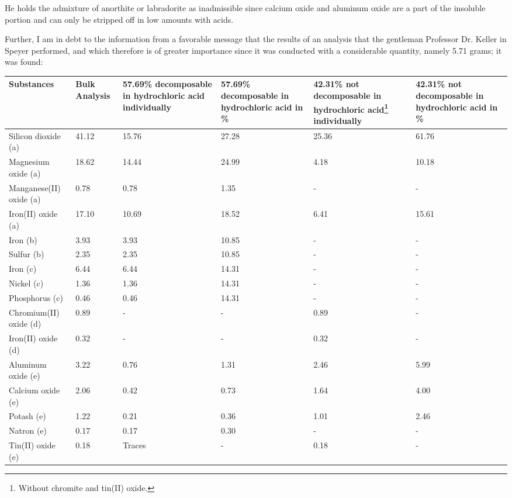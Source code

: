 \documentclass[a4paper, 12pt, oneside]{article}
\begin{document}
He holds the admixture of anorthite or labradorite as inadmissible since calcium oxide and aluminum oxide are a part of the insoluble portion and can only be stripped off in low amounts with acids.

Further, I am in debt to the information from a favorable message that the results of an analysis that the gentleman Professor Dr. Keller in Speyer performed, and which therefore is of greater importance since it was conducted with a considerable quantity, namely 5.71 grams; it was found:
\begin{center}
    \begin{tabular}{ |l|p{1.3cm}|p{1.7cm}|p{1.7cm}|p{1.7cm}|p{1.7cm}| }
        \hline
        Substances & \small{Bulk Analysis} & \small{57.69\% decomposable in hydrochloric acid individually} & \small{57.69\% decomposable in hydrochloric acid in \%} & \small{42.31\% not decomposable in hydrochloric acid\footnote{Without chromite and tin(II) oxide.} individually} & \small{42.31\% not decomposable in hydrochloric acid in \%}\\\hline
        Silicon dioxide (a) & 41.12 & 15.76 & 27.28 & 25.36 & 61.76\\\hline
        Magnesium oxide (a) & 18.62 & 14.44 & 24.99 & 4.18 & 10.18\\\hline
        Manganese(II) oxide (a) & 0.78 & 0.78 & 1.35 & - & -\\\hline
        Iron(II) oxide (a) & 17.10 & 10.69 & 18.52 & 6.41 & 15.61\\\hline
        Iron (b) & 3.93 & 3.93 & 10.85 & - & -\\\hline
        Sulfur (b) & 2.35 & 2.35 & 10.85 & - & -\\\hline
        Iron (c) & 6.44 & 6.44 & 14.31 & - & -\\\hline
        Nickel (c) & 1.36 & 1.36 & 14.31 & - & -\\\hline
        Phosphorus (c) & 0.46 & 0.46 & 14.31 & - & -\\\hline
        Chromium(II) oxide (d) & 0.89 & - & - & 0.89 & -\\\hline
        Iron(II) oxide (d) & 0.32 & - & - & 0.32 & -\\\hline
        Aluminum oxide (e) & 3.22 & 0.76 & 1.31 & 2.46 & 5.99\\\hline
        Calcium oxide (e) & 2.06 & 0.42 & 0.73 & 1.64 & 4.00\\\hline
        Potash (e) & 1.22 & 0.21 & 0.36 & 1.01 & 2.46\\\hline
        Natron (e) & 0.17 & 0.17 & 0.30 & - & -\\\hline
        Tin(II) oxide (e) & 0.18 & Traces & - & 0.18 & -\\
        \hline
    \end{tabular}
\end{center}
\end{document}
